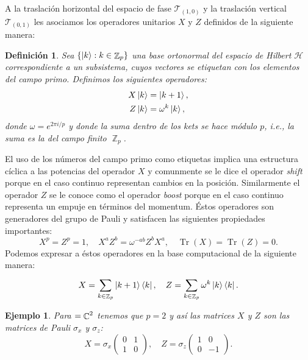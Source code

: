 \documentclass[a4paper]{report}
\DeclareMathOperator{\C}{\mathbb{C}}
\DeclareMathOperator{\Z}{\mathbb{Z}}
\let\H\relax
\DeclareMathOperator{\H}{\mathcal H}
\DeclareMathOperator{\Tr}{Tr}
\newtheorem{definition}{Definición}
\newtheorem{example}{Ejemplo}
\begin{document}
  A la traslación horizontal del espacio de fase $\mathcal
  T_{(1,0)}$ y la traslación vertical $\mathcal T_{(0,1)}$
  les asociamos los operadores unitarios $X$ y $Z$ definidos
  de la siguiente manera:
  \begin{definition}
    Sea $\{\ket k : k \in \Z_p\}$ una base ortonormal del
    espacio de Hilbert $\mathcal H$ correspondiente a un
    subsistema, cuyos vectores se etiquetan con los elementos
    del campo primo. Definimos los siguientes operadores:
    \begin{align}
      X \ket k
      &= \ket{k + 1}, \\
      Z \ket k
      &= \omega^{k} \ket k,
    \end{align}
    donde $\omega = e^{2\pi i / p}$ y donde la suma dentro
    de los kets se hace módulo $p$, i.e., la suma es la del
    campo finito $\Z_p$.
  \end{definition}
  El uso de los números del campo primo como etiquetas
  implica una estructura cíclica a las potencias del
  operador $X$ y comunmente se le dice el operador
  \textit{shift} porque en el caso continuo representan
  cambios en la posición. Similarmente el operador $Z$ se le
  conoce como el operador \textit{boost} porque en el caso
  continuo representa un empuje en términos del momentum.
  Éstos operadores son generadores del grupo de Pauli y
  satisfacen las siguientes propiedades importantes:
  \begin{equation}
    X^{p} = Z^{p} = 1,
    \quad
    X^{a} Z^{b} = \omega^{-ab} Z^{b} X^{a},
    \quad
    \Tr(X) = \Tr(Z) = 0.
  \end{equation}
  Podemos expresar a éstos operadores en la base
  computacional de la siguiente manera:
  \begin{equation}
    X = \sum_{k \in \Z_p}^{} \ket{k+1}\bra{k}, \\
    \quad
    Z = \sum_{k \in \Z_p}^{} \omega^{k} \ket k \bra k.
  \end{equation}
  \begin{example}
    Para $\H = \C^{2}$ tenemos que $p = 2$ y así las
    matrices $X$ y $Z$ son las matrices de Pauli $\sigma_x$
    y $\sigma_z$:
    \[
      X = \sigma_x
      \begin{pmatrix} 0 & 1 \\ 1 & 0 \end{pmatrix},
      \quad
      Z = \sigma_z
      \begin{pmatrix} 1 & 0 \\ 0 & -1 \end{pmatrix}. 
    \] 
  \end{example}
\end{document}
